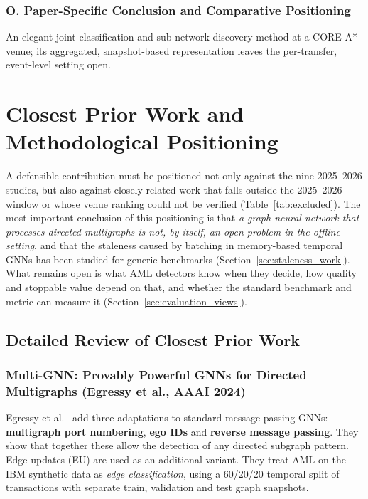 \documentclass[11pt,a4paper]{article}
\begin{document}
\subsubsection*{O. Paper-Specific Conclusion and Comparative Positioning}
An elegant joint classification and sub-network discovery method at a CORE A* venue; its aggregated, snapshot-based representation leaves the per-transfer, event-level setting open.

\section{Closest Prior Work and Methodological Positioning}
\label{sec:prior_work}

A defensible contribution must be positioned not only against the nine 2025--2026 studies, but also against closely related work that falls outside the 2025--2026 window or whose venue ranking could not be verified (Table~\ref{tab:excluded}). The most important conclusion of this positioning is that \emph{a graph neural network that processes directed multigraphs is not, by itself, an open problem in the offline setting}, and that the staleness caused by batching in memory-based temporal GNNs has been studied for generic benchmarks (Section~\ref{sec:staleness_work}). What remains open is what AML detectors know when they decide, how quality and stoppable value depend on that, and whether the standard benchmark and metric can measure it (Section~\ref{sec:evaluation_views}).

\subsection{Detailed Review of Closest Prior Work}

\subsubsection{Multi-GNN: Provably Powerful GNNs for Directed Multigraphs (Egressy et al., AAAI 2024)}
Egressy et al.\ \cite{egressy2024multigraph} add three adaptations to standard message-passing GNNs: \textbf{multigraph port numbering}, \textbf{ego IDs} and \textbf{reverse message passing}. They show that together these allow the detection of any directed subgraph pattern. Edge updates (EU) are used as an additional variant. They treat AML on the IBM synthetic data \cite{altman2023ibmaml} as \emph{edge classification}, using a 60/20/20 temporal split of transactions with separate train, validation and test graph snapshots.
\end{document}
